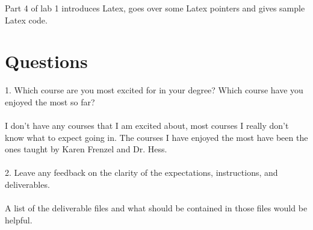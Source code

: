 Part 4 of lab 1 introduces Latex, goes over some Latex pointers and gives sample Latex code.


\section{Questions}

1. Which course are you most excited for in your degree? Which course have you enjoyed the most so far?
\\ \\
I don't have any courses that I am excited about, most courses I really don't know what to expect going in.  The courses I have enjoyed the most have been the ones taught by Karen Frenzel and Dr. Hess.
\\ \\ 
2. Leave any feedback on the clarity of the expectations, instructions, and deliverables.
\\ \\ 
A list of the deliverable files and what should be contained in those files would be helpful.
